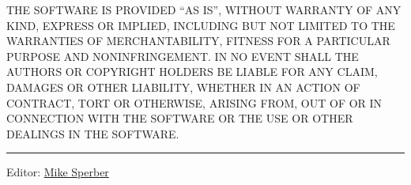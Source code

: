 THE SOFTWARE IS PROVIDED ``AS IS'', WITHOUT WARRANTY OF ANY KIND,
EXPRESS OR IMPLIED, INCLUDING BUT NOT LIMITED TO THE WARRANTIES OF
MERCHANTABILITY, FITNESS FOR A PARTICULAR PURPOSE AND NONINFRINGEMENT.
IN NO EVENT SHALL THE AUTHORS OR COPYRIGHT HOLDERS BE LIABLE FOR ANY
CLAIM, DAMAGES OR OTHER LIABILITY, WHETHER IN AN ACTION OF CONTRACT,
TORT OR OTHERWISE, ARISING FROM, OUT OF OR IN CONNECTION WITH THE
SOFTWARE OR THE USE OR OTHER DEALINGS IN THE SOFTWARE.

\begin{center}\rule{0.5\linewidth}{\linethickness}\end{center}

Editor:
\href{mailto:srfi-editors\%20at\%20srfi\%20dot\%20schemers\%20dot\%20org}{Mike
Sperber}
